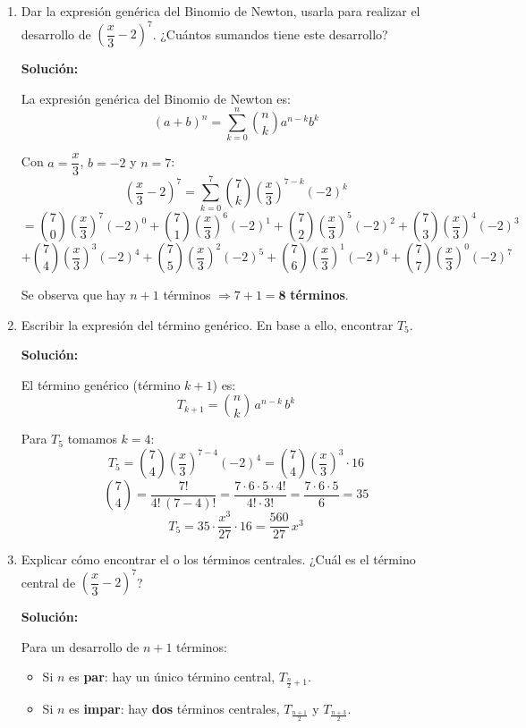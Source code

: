 \documentclass[12pt]{article}
\newcommand{\solucion}{%
    \vspace{0.8em}%
    \textbf{Solución:}%
}
\begin{document}
\begin{enumerate}[label=\alph*.-]
    \item Dar la expresión genérica del Binomio de Newton, usarla para realizar el desarrollo de $\left(\dfrac{x}{3}-2\right)^7$. ¿Cuántos sumandos tiene este desarrollo?

    \solucion

    La expresión genérica del Binomio de Newton es:
    \[
    (a+b)^n = \sum_{k=0}^{n}\binom{n}{k}a^{n-k}b^k
    \]

    Con $a=\dfrac{x}{3}$, $b=-2$ y $n=7$:
    \[
    \left(\frac{x}{3}-2\right)^7 = \sum_{k=0}^{7}\binom{7}{k}\left(\frac{x}{3}\right)^{7-k}(-2)^k
    \]
    \[
    = \binom{7}{0}\left(\frac{x}{3}\right)^7(-2)^0
    + \binom{7}{1}\left(\frac{x}{3}\right)^6(-2)^1
    + \binom{7}{2}\left(\frac{x}{3}\right)^5(-2)^2
    + \binom{7}{3}\left(\frac{x}{3}\right)^4(-2)^3
    \]
    \[
    + \binom{7}{4}\left(\frac{x}{3}\right)^3(-2)^4
    + \binom{7}{5}\left(\frac{x}{3}\right)^2(-2)^5
    + \binom{7}{6}\left(\frac{x}{3}\right)^1(-2)^6
    + \binom{7}{7}\left(\frac{x}{3}\right)^0(-2)^7
    \]

    Se observa que hay $n+1$ términos $\Rightarrow 7+1 = \mathbf{8}$ \textbf{términos}.

    \item Escribir la expresión del término genérico. En base a ello, encontrar $T_5$.

    \solucion

    El término genérico (término $k+1$) es:
    \[
    T_{k+1} = \binom{n}{k}\,a^{n-k}\,b^k
    \]

    Para $T_5$ tomamos $k=4$:
    \[
    T_5 = \binom{7}{4}\left(\frac{x}{3}\right)^{7-4}(-2)^4
    = \binom{7}{4}\left(\frac{x}{3}\right)^3 \cdot 16
    \]
    \[
    \binom{7}{4} = \frac{7!}{4!\,(7-4)!} = \frac{7\cdot6\cdot5\cdot4!}{4!\cdot3!}
    = \frac{7\cdot6\cdot5}{6} = 35
    \]
    \[
    T_5 = 35\cdot\frac{x^3}{27}\cdot16 = \frac{560}{27}\,x^3
    \]

    \newpage
    \item Explicar cómo encontrar el o los términos centrales. ¿Cuál es el término central de $\left(\dfrac{x}{3}-2\right)^7$?

    \solucion

    Para un desarrollo de $n+1$ términos:
    \begin{itemize}
        \item Si $n$ es \textbf{par}: hay un único término central, $T_{\frac{n}{2}+1}$.
        \item Si $n$ es \textbf{impar}: hay \textbf{dos} términos centrales, $T_{\frac{n+1}{2}}$ y $T_{\frac{n+3}{2}}$.
    \end{itemize}


\end{enumerate}
\end{document}
